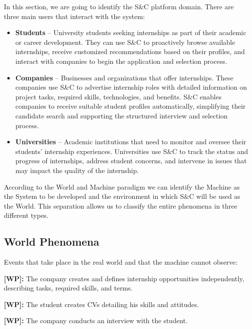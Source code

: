 In this section, we are going to identify the S\&C platform domain. There are three main users that interact with the system:

\begin{itemize}
\item
  \textbf{Students} -- University students seeking internships as part of their academic or career development. They can use S\&C to
  proactively browse available internships, receive customized recommendations based on their profiles, and interact with companies to begin the application and selection process.
\item
  \textbf{Companies} -- Businesses and organizations that offer internships. These companies use S\&C to advertise internship roles with detailed information on project tasks, required skills, technologies, and benefits. S\&C enables companies to receive suitable student profiles automatically, simplifying their candidate search and supporting the structured interview and selection process.
\item
  \textbf{Universities} -- Academic institutions that need to monitor and oversee their students' internship experiences. Universities use S\&C to track the status and progress of internships, address student concerns, and intervene in issues that may impact the quality of the internship.
\end{itemize}

According to the World and Machine paradigm we can identify the Machine as the System to be developed and the environment in which S\&C will be used as the World. This separation allows us to classify the entire phenomena in three different types.

\subsection{World Phenomena}
\label{subsec:world_phenomena}%

Events that take place in the real world and that the machine cannot observe:

\setcounter{w}{1}
\newcommand{\cw}{\thew{}}
\textbf{[WP\cw]:} The company creates and defines internship opportunities independently, describing tasks, required skills, and terms.

\textbf{[WP\cw]:} The student creates CVs detailing his skills and attitudes.

\textbf{[WP\cw]:} The company conducts an interview with the student.

